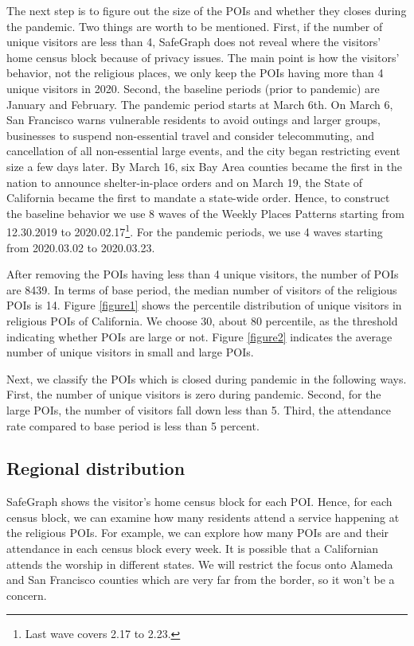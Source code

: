 \documentclass[12pt,english]{article}
\begin{document}
The next step is to figure out the size of the POIs and whether they closes during the pandemic. Two things are worth to be mentioned. First, if the number of unique visitors are less than 4, SafeGraph does not reveal where the visitors' home census block because of privacy issues. The main point is how the visitors' behavior, not the religious places, we only keep the POIs having more than 4 unique visitors in 2020. Second, the baseline periods (prior to pandemic) are January and February. The pandemic period starts at March 6th. On March 6, San Francisco warns vulnerable residents to avoid outings and larger groups, businesses to suspend non-essential travel and consider telecommuting, and cancellation of all non-essential large events, and the city began restricting event size a few days later. By March 16, six Bay Area counties became the first in the nation to announce shelter-in-place orders and on March 19, the State of California became the first to mandate a state-wide order. Hence, to construct the baseline behavior we use 8 waves of the Weekly Places Patterns starting from 12.30.2019 to 2020.02.17\footnote{Last wave covers 2.17 to 2.23.}. For the pandemic periods, we use 4 waves starting from 2020.03.02 to 2020.03.23. 

After removing the POIs having less than 4 unique visitors, the number of POIs are 8439. In terms of base period, the median number of visitors of the religious POIs is 14. Figure \ref{figure1} shows the percentile distribution of unique visitors in religious POIs of California. We choose 30, about 80 percentile, as the threshold indicating whether POIs are large or not. Figure \ref{figure2} indicates the average number of unique visitors in small and large POIs.

Next, we classify the POIs which is closed during pandemic in the following ways. First, the number of unique visitors is zero during pandemic. Second, for the large POIs, the number of visitors fall down less than 5. Third, the attendance rate compared to base period is less than 5 percent.  

\subsection{Regional distribution}
SafeGraph shows the visitor's home census block for each POI. Hence, for each census block, we can examine how many residents attend a service happening at the religious POIs. For example, we can explore how many POIs are and their attendance in each census block every week. It is possible that a Californian attends the worship in different states. We will restrict the focus onto Alameda and San Francisco counties  which are very far from the border, so it won't be a concern. 
\end{document}
